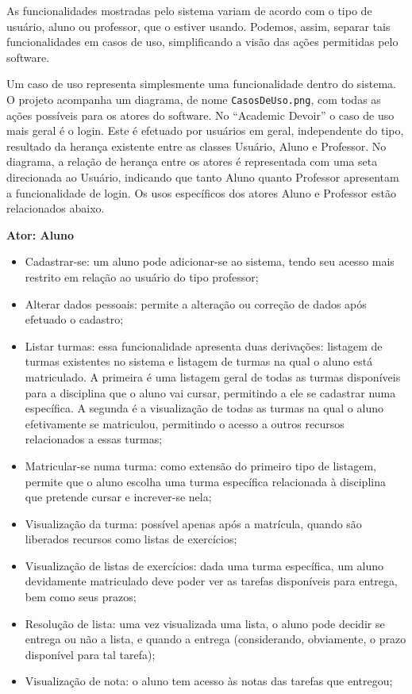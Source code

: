 \documentclass[12pt,letterpaper]{article}
\begin{document}
As funcionalidades mostradas pelo sistema variam de acordo com o tipo de usuário, aluno ou professor, que o estiver usando. Podemos, assim, separar tais funcionalidades em casos de uso, simplificando a visão das ações permitidas pelo software. 

Um caso de uso representa simplesmente uma funcionalidade dentro do sistema. O projeto acompanha um diagrama, de nome \texttt{CasosDeUso.png}, com todas as ações possíveis para os atores do software.
No “Academic Devoir” o caso de uso mais geral é o login. Este é efetuado por usuários em geral, independente do tipo, resultado da herança existente entre as classes Usuário, Aluno e Professor. No diagrama, a relação de herança entre os atores é representada com uma seta direcionada ao Usuário, indicando que tanto Aluno quanto Professor apresentam a funcionalidade de login. 
Os usos específicos dos atores Aluno e Professor estão relacionados abaixo.

\vspace{1cm}
{\large {\bf Ator: Aluno}}
\vspace{0.5cm}

\begin{itemize}
\item{}Cadastrar-se: um aluno pode adicionar-se ao sistema, tendo seu acesso mais restrito em relação ao usuário do tipo professor;
\item{}Alterar dados pessoais: permite a alteração ou correção de dados após efetuado o cadastro;
\item{}Listar turmas: essa funcionalidade apresenta duas derivações: listagem de turmas existentes no sistema e listagem de turmas na qual o aluno está matriculado. A primeira é uma listagem geral de todas as turmas disponíveis para a disciplina que o aluno vai cursar, permitindo a ele se cadastrar numa específica. A segunda é a visualização de todas as turmas na qual o aluno efetivamente se matriculou, permitindo o acesso a outros recursos relacionados a essas turmas;
\item{}Matricular-se numa turma: como extensão do primeiro tipo de listagem, permite que o aluno escolha uma turma específica relacionada à disciplina que pretende cursar e increver-se nela;
\item{}Visualização da turma: possível apenas após a matrícula, quando são liberados recursos como listas de exercícios;
\item{}Visualização de listas de exercícios: dada uma turma específica, um aluno devidamente matriculado deve poder ver as tarefas disponíveis para entrega, bem como seus prazos;
\item{}Resolução de lista: uma vez visualizada uma lista, o aluno pode decidir se entrega ou não a lista, e quando a entrega (considerando, obviamente, o prazo disponível para tal tarefa);
\item{}Visualização de nota: o aluno tem acesso às notas das tarefas que entregou;
\end{itemize}
\end{document}
